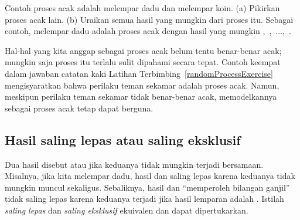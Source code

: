 \begin{exercisewrap}
\begin{nexercise} \label{randomProcessExercise}
Contoh proses acak adalah melempar dadu dan melempar koin. (a) Pikirkan proses acak lain. (b) Uraikan semua hasil yang mungkin dari proses itu. Sebagai contoh, melempar dadu adalah proses acak dengan hasil yang mungkin \mbox{, , ..., }.\footnotemark
\end{nexercise}
\end{exercisewrap}

Hal-hal yang kita anggap sebagai proses acak belum tentu benar-benar acak; mungkin saja proses itu terlalu sulit dipahami secara tepat. Contoh keempat dalam jawaban catatan kaki Latihan Terbimbing~\ref{randomProcessExercise} mengisyaratkan bahwa perilaku teman sekamar adalah proses acak. Namun, meskipun perilaku teman sekamar tidak benar-benar acak, memodelkannya sebagai proses acak tetap dapat berguna.



\subsection{Hasil saling lepas atau saling eksklusif}


Dua hasil disebut  atau  jika keduanya tidak mungkin terjadi bersamaan. Misalnya, jika kita melempar dadu, hasil  dan  saling lepas karena keduanya tidak mungkin muncul sekaligus. Sebaliknya, hasil  dan “memperoleh bilangan ganjil” tidak saling lepas karena keduanya terjadi jika hasil lemparan adalah . Istilah \emph{saling lepas} dan \emph{saling eksklusif} ekuivalen dan dapat dipertukarkan.

